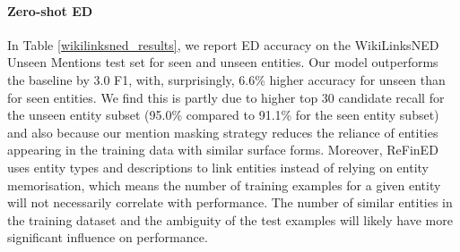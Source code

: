 \documentclass[11pt]{article}
\begin{document}
\paragraph{Zero-shot ED}
In Table \ref{wikilinksned_results}, we report ED accuracy on the WikiLinksNED Unseen Mentions test set for seen and unseen entities. Our model outperforms the baseline by 3.0 F1, with, surprisingly, 6.6\% higher accuracy for unseen than for seen entities. We find this is partly due to higher top 30 candidate recall for the unseen entity subset (95.0\% compared to 91.1\% for the seen entity subset) and also because our mention masking strategy reduces the reliance of entities appearing in the training data with similar surface forms. Moreover, ReFinED uses entity types and descriptions to link entities instead of relying on entity memorisation, which means the number of training examples for a given entity will not necessarily correlate with performance. The number of similar entities in the training dataset and the ambiguity of the test examples \cite{provatorova-etal-2021-robustness} will likely have more significant influence on performance.





\begin{table}[h]
\centering
{}
	\caption{ED accuracy on WikiLinksNED Unseen Mentions test.}
	\label{wikilinksned_results}
\end{table}
\end{document}
